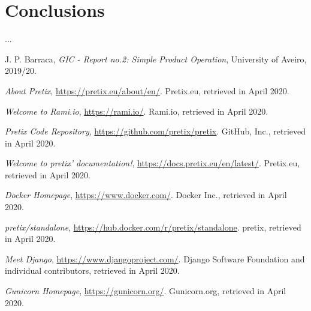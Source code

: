 \documentclass[12pt]{article}
\begin{document}
\newpage
\section*{Conclusions} \label{conclusions} %

...

\newpage
\begin{thebibliography}{9} %
  

  J. P. Barraca,
  \textit{GIC - Report no.2: Simple Product Operation},
  University of Aveiro,
  2019/20.
  \vspace{-10pt}

  \textit{About Pretix},
  \url{https://pretix.eu/about/en/}.
  Pretix.eu,
  retrieved in April 2020.
  \vspace{-10pt}

  \textit{Welcome to Rami.io},
  \url{https://rami.io/}.
  Rami.io,
  retrieved in April 2020.
  \vspace{-10pt}

  \textit{Pretix Code Repository},
  \url{https://github.com/pretix/pretix}.
  GitHub, Inc.,
  retrieved in April 2020.
  \vspace{-10pt}

  \textit{Welcome to pretix' documentation!},
  \url{https://docs.pretix.eu/en/latest/}.
  Pretix.eu,
  retrieved in April 2020.
  \vspace{-10pt}

  \textit{Docker Homepage},
  \url{https://www.docker.com/}.
  Docker Inc.,
  retrieved in April 2020.
  \vspace{-26pt}

  \textit{pretix/standalone},
  \url{https://hub.docker.com/r/pretix/standalone}.
  pretix,
  retrieved in April 2020.
  \vspace{-10pt}

  \textit{Meet Django},
  \url{https://www.djangoproject.com/}.
  Django Software Foundation and individual contributors,
  retrieved in April 2020.
  \vspace{-10pt}

  \textit{Gunicorn Homepage},
  \url{https://gunicorn.org/}.
  Gunicorn.org,
  retrieved in April 2020.
  \vspace{-10pt}


\end{thebibliography}
\end{document}
